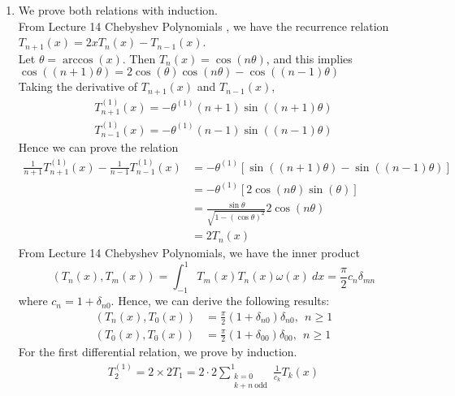 \documentclass[a4paper,8pt]{article}
\begin{document}
\newpage

\begin{enumerate}[label=Q\arabic	*.]
\setlength{\itemsep}{0pt}
\setcounter{enumi}{1}
\item We prove both relations with induction.\\
From Lecture 14 Chebyshev Polynomials , we have the recurrence relation $T_{n+1}(x) = 2x T_n(x) - T_{n-1}(x)$.\\
Let $\theta = \arccos(x)$. Then $T_n(x) = \cos (n \theta)$, and this implies $\cos((n+1) \theta) = 2 \cos (\theta) \cos (n \theta) -  \cos ((n-1) \theta)$\\
\newline
Taking the derivative of $T_{n+1} (x)$ and $T_{n-1} (x)$,
\begin{align}
T^{(1)}_{n+1} (x) = - \theta^{(1)} (n+1) \sin ((n+1)\theta) \nonumber \\
T^{(1)}_{n-1} (x) = - \theta^{(1)} (n-1) \sin ((n-1)\theta) \nonumber
\end{align}
Hence we can prove the relation
\begin{align}
\frac{1}{n+1} T^{(1)}_{n+1} (x) - \frac{1}{n-1} T^{(1)}_{n-1} (x) &= - \theta^{(1)}[\sin((n+1)\theta) - \sin((n-1)\theta)] \nonumber \\
&= -\theta^{(1)} [2 \cos (n\theta)\sin(\theta)] \nonumber \\
&= \frac{\sin \theta}{\sqrt{1-(\cos\theta)^2}} 2 \cos (n \theta) \nonumber \\
&= 2 T_n(x) \nonumber
\end{align}
\newline
From Lecture 14 Chebyshev Polynomials, we have the inner product
\begin{equation}
(T_n(x), T_m(x)) = \int_{-1}^{1} T_m(x) T_n(x) \omega(x) \ dx = \frac{\pi}{2} c_n \delta_{mn} \nonumber
\end{equation}
where $c_n = 1 + \delta_{n0}$. Hence, we can derive the following results:
\begin{align}
(T_n(x), T_0(x)) &= \frac{\pi}{2} (1 + \delta_{n0}) \delta_{n0}, \ \ n \geq 1 \nonumber \\
(T_0(x), T_0(x)) &= \frac{\pi}{2} (1 + \delta_{00}) \delta_{00}, \ \ n \geq 1 \nonumber
\end{align}
\newline
For the first differential relation, we prove by induction.
\begin{align*}
T^{(1)}_2 = 2 \times 2 T_1 = 2 \cdot 2 \sum\limits^{1}_{\substack{k = 0 \\ k + n \ \text{odd}}} \frac{1}{c_k} T_k(x) \nonumber

\end{align*}
\end{enumerate}
\end{document}

